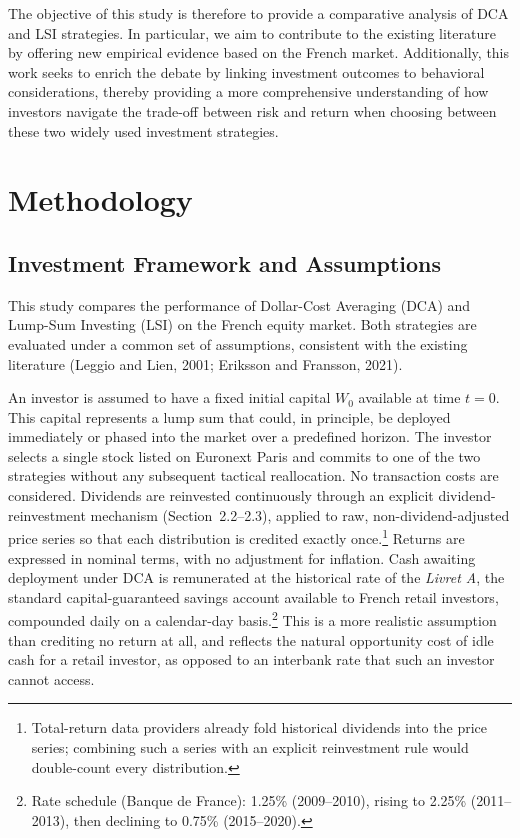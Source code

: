 \documentclass[11pt,a4paper]{article}
\begin{document}
The objective of this study is therefore to provide a comparative analysis of DCA and LSI strategies. In particular, we aim to contribute to the existing literature by offering new empirical evidence based on the French market. Additionally, this work seeks to enrich the debate by linking investment outcomes to behavioral considerations, thereby providing a more comprehensive understanding of how investors navigate the trade-off between risk and return when choosing between these two widely used investment strategies.


\section{Methodology}

\subsection{Investment Framework and Assumptions}

This study compares the performance of Dollar-Cost Averaging (DCA) and
Lump-Sum Investing (LSI) on the French equity market. Both strategies are
evaluated under a common set of assumptions, consistent with the existing
literature (Leggio and Lien, 2001; Eriksson and Fransson, 2021).

An investor is assumed to have a fixed initial capital $W_0$ available at
time $t = 0$. This capital represents a lump sum that could, in principle,
be deployed immediately or phased into the market over a predefined horizon. The investor selects a single stock listed on Euronext Paris and commits to one of the two strategies without any subsequent tactical
reallocation. No transaction costs are considered. Dividends are reinvested continuously through an explicit dividend-reinvestment mechanism (Section~2.2--2.3), applied to raw, non-dividend-adjusted price series so that each distribution is credited exactly once.\footnote{Total-return data providers already fold historical dividends into the price series; combining such a series with an explicit reinvestment rule would double-count every distribution.} Returns are expressed in nominal terms, with no adjustment for inflation. Cash awaiting deployment under DCA is remunerated at the historical rate of the \emph{Livret A}, the standard capital-guaranteed savings account available to French retail investors, compounded daily on a calendar-day basis.\footnote{Rate schedule (Banque de France): 1.25\% (2009--2010), rising to 2.25\% (2011--2013), then declining to 0.75\% (2015--2020).} This is a more realistic assumption than crediting no return at all, and reflects the natural opportunity cost of idle cash for a retail investor, as opposed to an interbank rate that such an investor cannot access.
\end{document}

